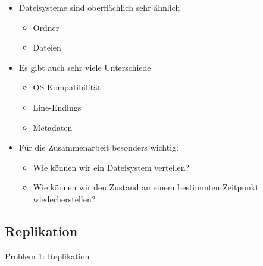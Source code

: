 \begin{frame}
    \slidehead
    \begin{itemize}[<+->]
        \item Dateisysteme sind oberflächlich sehr ähnlich
        \begin{itemize}
            \item Ordner
            \item Dateien
        \end{itemize}
        \item Es gibt auch sehr viele Unterschiede
        \begin{itemize}
            \item OS Kompatibilität
            \item Line-Endings
            \item Metadaten
        \end{itemize}
        \item Für die Zusammenarbeit besonders wichtig:
        \begin{itemize}
            \item Wie können wir ein Dateisystem verteilen?
            \item Wie können wir den Zustand an einem bestimmten Zeitpunkt wiederherstellen?
        \end{itemize}
    \end{itemize}
\end{frame}

\subsection{Replikation}\label{subsec:replikation}

\begin{frame}[c]
    \slidehead
    \centering
    \Large
    Problem 1: Replikation
\end{frame}

